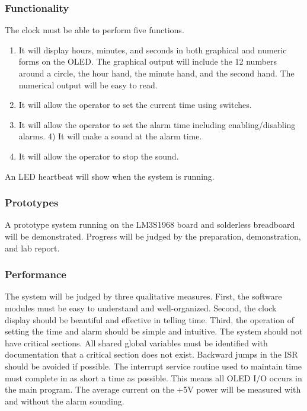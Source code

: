 \documentclass[twoside]{article}
\begin{document}
\subsubsection{Functionality} 
The clock must be able to perform
five functions.
\begin{enumerate}
\item It will display hours, minutes, and seconds in
both graphical and numeric forms on the OLED. The graphical output will include the 12 numbers around a circle, the hour hand, the minute hand, and the second hand. The numerical output will be easy to read. 
\item It will allow the operator to set the current time using switches. 
\item It will allow the operator to set the alarm time including enabling/disabling alarms. 4) It will make a sound at the alarm time.
\item It will allow the operator to stop the sound.
\end{enumerate}
An LED heartbeat will show when the system is running.
\subsubsection{Prototypes} 
A prototype system running on the LM3S1968 board and solderless breadboard will be demonstrated. Progress will be judged by the preparation, demonstration, and lab report.
\subsubsection{Performance} 
The system will be judged by three qualitative measures. First, the software modules must be easy to understand and well-organized. Second, the clock display should be beautiful and effective in telling time. Third, the operation of setting the time and alarm should be simple and intuitive. The system should not have critical
sections. All shared global variables must be identified with documentation that a critical section does not exist. Backward jumps in the ISR should be avoided if possible. The interrupt service routine used to maintain time must complete in as short a time as possible. This means all OLED I/O occurs in the main program. The average current on the +5V power will be measured with and without the alarm sounding.
\end{document}
